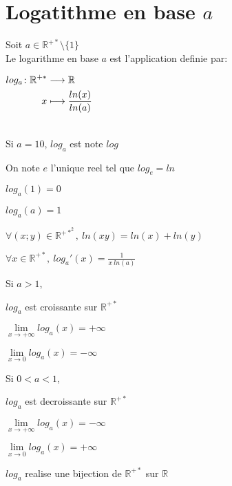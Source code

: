 \documentclass[12pt,twoside,a4paper]{article}
\begin{document}
\section{Logatithme en base $a$}
	\begin{defi}
		Soit $a\in\mathbb{R}^{+*}\setminus\{1\}$\\
		Le logarithme en base $a$ est l'application definie par:\\
		\begin{tab}\begin{tab}$\begin{aligned}[t]log_a\colon\mathbb{R}^{+*}&\longrightarrow\mathbb{R} \\x&\longmapsto\frac{ln(x)}{ln(a)}\end{aligned}$\\\\\end{tab}\end{tab}
		\begin{liste}
			\item Si $a=10$, $log_a$ est note $log$
			\item On note $e$ l'unique reel tel que $log_e=ln$
		\end{liste}
	\end{defi}
	\begin{prop}
		\begin{liste}
			\item $log_a(1)=0$
			\item $log_a(a)=1$
			\item $\forall(x;y)\in\mathbb{R}^{+*^2},\ ln\left(xy\right)=ln(x)+ln(y)$
			\item $\forall x\in\mathbb{R}^{+*},\ log_a'(x)=\frac{1}{x\ ln(a)}$
			\item Si $a>1$,
				\begin{liste}
					\item $log_a$ est croissante sur $\mathbb{R}^{+*}$
					\item $\lim\limits_{x\rightarrow+\infty}log_a(x)=+\infty$
					\item $\lim\limits_{x\rightarrow0}log_a(x)=-\infty$
				\end{liste}
			\item Si $0<a<1$,
				\begin{liste}
					\item $log_a$ est decroissante sur $\mathbb{R}^{+*}$
					\item $\lim\limits_{x\rightarrow+\infty}log_a(x)=-\infty$
					\item $\lim\limits_{x\rightarrow0}log_a(x)=+\infty$
				\end{liste}
				\item $log_a$ realise une bijection de $\mathbb{R}^{+*}$ sur $\mathbb{R}$
		\end{liste}
	\end{prop}
\end{document}
